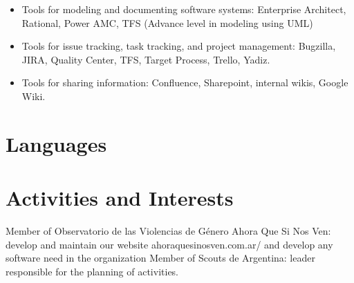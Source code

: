 \documentclass[11pt,a4paper,sans]{moderncv}
\begin{document}
\begin{itemize}
  \item Tools for modeling and documenting software systems: Enterprise Architect, Rational, Power AMC, TFS (Advance level in modeling using UML)
  \item Tools for issue tracking, task tracking, and project management: Bugzilla, JIRA, Quality Center, TFS, Target Process, Trello, Yadiz.
  \item Tools for sharing information: Confluence, Sharepoint, internal wikis, Google Wiki.

\end{itemize}

\section{Languages}


\section{Activities and Interests}

Member of Observatorio de las Violencias de Género Ahora Que Si Nos Ven: develop and maintain our website ahoraquesinosven.com.ar/ and develop any software need in the organization
Member of Scouts de Argentina: leader responsible for the planning of activities.
\end{document}
